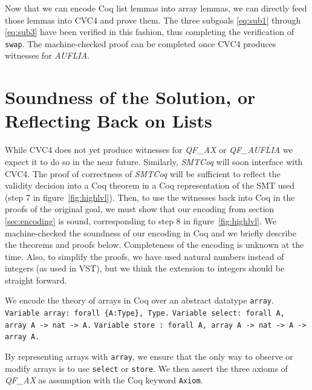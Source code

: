\documentclass[onecolumn, preprint]{sigplanconf}
\begin{document}
%

Now that we can encode Coq list lemmas into array lemmas, we can directly feed those lemmas into CVC4 and prove them. The three subgoals \ref{eq:sub1} through \ref{eq:sub3} have been verified in this fashion, thus completing the verification of \texttt{swap}. The machine-checked proof can be completed once CVC4 produces witnesses for \emph{AUFLIA}.


\section{Soundness of the Solution, or Reflecting Back on Lists}
\label{sec:proofs}
While CVC4 does not yet produce witnesses for \emph{QF\_AX} or \emph{QF\_AUFLIA} we expect it to do so in the near future. Similarly, \emph{SMTCoq} will soon interface with CVC4. The proof of correctness of \emph{SMTCoq} will be sufficient to reflect the validity decision into a Coq theorem in a Coq representation of the SMT used (step 7 in figure~\ref{fig:highlvl}). Then, to use the witnesses back into Coq in the proofs of the original goal, we must show that our encoding from section \ref{sec:encoding} is sound, corresponding to step 8 in figure~\ref{fig:highlvl}. We machine-checked the soundness of our encoding in Coq and we briefly describe the theorems and proofs below. Completeness of the encoding is unknown at the time. 
Also, to simplify the proofs, we have used natural numbers instead of integers (as used in VST), but we think the extension to integers should be straight forward.

We encode the theory of arrays in Coq over an abstract datatype \texttt{array}.  
 \newline
  \texttt{Variable array: forall \{A:Type\}, Type.} \newline
  \texttt{Variable select: forall {A}, array A -> nat -> A.} \newline
  \texttt{Variable store : forall {A}, array A -> nat -> A -> array A.}

By representing arrays with \texttt{array}, we ensure that the only way to observe or modify arrays is to use \texttt{select} or \texttt{store}. We then assert the three axioms of \emph{QF\_AX} as assumption with the Coq keyword \texttt{Axiom}.
\end{document}
